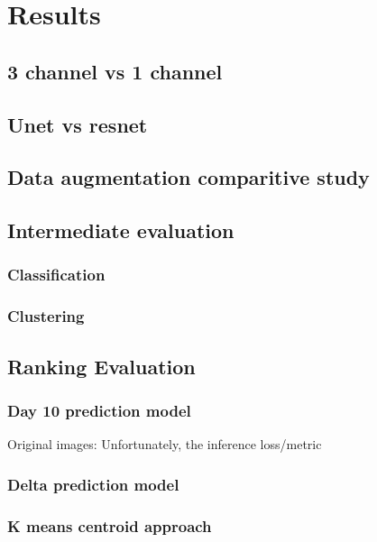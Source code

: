 \chapter{Results} \label{chapter:experimentsresults} 

\section{3 channel vs 1 channel}
\section{Unet vs resnet}

\section{Data augmentation comparitive study}

\section{Intermediate evaluation}
\subsection{Classification} \label{subsection:classification}

\subsection{Clustering} \label{subsection:kmeans}


\section{Ranking Evaluation}

\subsection{Day 10 prediction model} \label{subection:day10prediction}
Original images: Unfortunately, the inference loss/metric 

\subsection{Delta prediction model} \label{subsection:deltaprediction}
\subsection{K means centroid approach} \label{subsection:kmeanscentroid}





